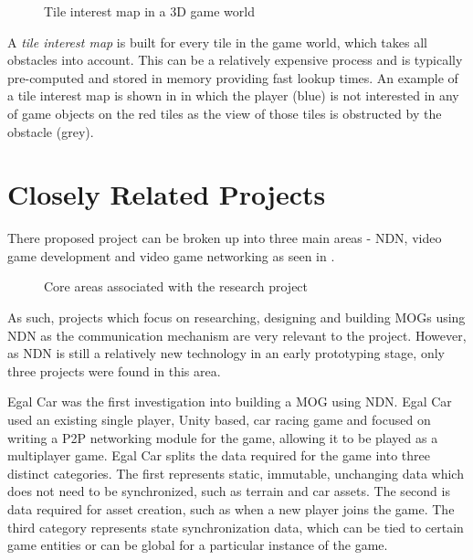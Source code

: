 \begin{figure}[H]
    \centering
    \caption{Tile interest map in a 3D game world}
    \label{fig:tile-im}
\end{figure}

 A \textit{tile interest map} is built for every tile in the game world, which takes all obstacles into account. This can be a relatively expensive process and is typically pre-computed and stored in memory providing fast lookup times. An example of a tile interest map is shown in  in which the player (blue) is not interested in any of game objects on the red tiles as the view of those tiles is obstructed by the obstacle (grey).   



\section{Closely Related Projects}\label{sec:sota:close-projects}
There proposed project can be broken up into three main areas - NDN, video game development and video game networking as seen in . 

\begin{figure}[H]
    \centering
    \caption{Core areas associated with the research project}
    \label{fig:venn}
\end{figure}

As such, projects which focus on researching, designing and building MOGs using NDN as the communication mechanism are very relevant to the project. However, as NDN is still a relatively new technology in an early prototyping stage, only three projects were found in this area.

Egal Car was the first investigation into building a MOG using NDN. Egal Car used an existing single player, Unity based, car racing game and focused on writing a P2P networking module for the game, allowing it to be played as a multiplayer game. Egal Car splits the data required for the game into three distinct categories. The first represents static, immutable, unchanging data which does not need to be synchronized, such as terrain and car assets. The second is data required for asset creation, such as when a new player joins the game. The third category represents state synchronization data, which can be tied to certain game entities or can be global for a particular instance of the game.

